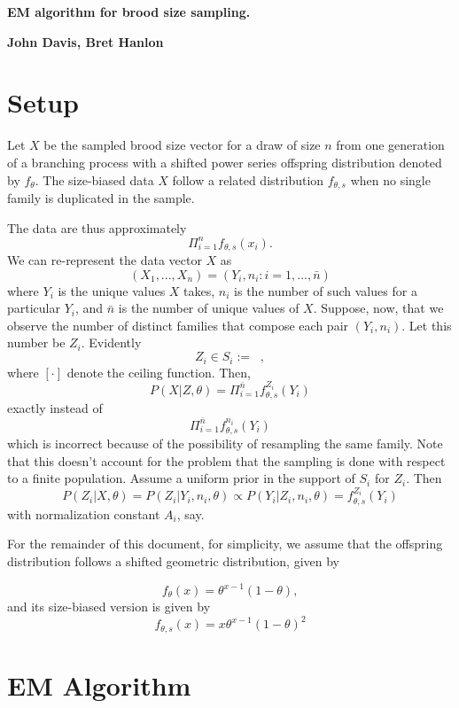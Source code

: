 \documentclass[11 pt]{article}
\renewcommand{\th}{\theta}
\newcommand{\fbr}[1]{ \mathop{ \left\{ #1 \right\} } }
\newcommand{\Title}[1]{\begin{center}{\Large \bf #1} \end{center}}
\newcommand{\fth}{f_{\th}}
\newcommand{\fths}{f_{\th,s}}
\begin{document}
\Title{EM algorithm for brood size sampling.}

\Title{John Davis, Bret Hanlon}

\section{Setup}
Let $X$ be the sampled brood size vector for a draw of size $n$ from one generation of a branching process with a shifted power series offspring distribution denoted by $\fth$. The size-biased data $X$ follow a related distribution $\fths$ when no single family is duplicated in the sample. 

The data are thus approximately 
\[
\Pi_{i=1}^n \fths(x_i).
\]
We can re-represent the data vector $X$ as 
\[
(X_1,...,X_n) = (Y_i,n_i : i=1,...,\bar{n})
\]
where $Y_i$ is the unique values $X$ takes, $n_i$ is the number of such values for a particular $Y_i$, and $\bar{n}$ is the number of unique values of $X$. Suppose, now, that we observe the number of distinct families that compose each pair $(Y_i,n_i)$. Let this number be $Z_i$. Evidently
\[
Z_i \in S_i:= \fbr{ [n_i / y_i],...,n_i},
\]
where $[\cdot]$ denote the ceiling function.  Then, 
\[
P(X|Z,\th) = \Pi_{i=1}^{\bar{n}} \fths^{Z_i}(Y_i)
\]
exactly instead of
\[
\Pi_{i=1}^{\bar{n}} \fths^{n_i}(Y_i)
\]
which is incorrect because of the possibility of resampling the same family. Note that this doesn't account for the problem that the sampling is done with respect to a finite population.  Assume a uniform prior in the support of $S_i$ for $Z_i$. Then
\[
P(Z_i|X,\th) = P(Z_i|Y_i,n_i,\th) \propto P(Y_i|Z_i,n_i,\th) = \fths^{Z_i}(Y_i)
\]
with normalization constant $A_i$, say.

For the remainder of this document, for simplicity, we assume that the offspring distribution follows a shifted geometric distribution, given by

\[
\fth(x) = \th^{x -1} (1 - \th),
\]
and its size-biased version is given by
\[
\fths(x) = x \th^{x - 1} (1 - \th)^2
\]

\section{EM Algorithm}
\end{document}
